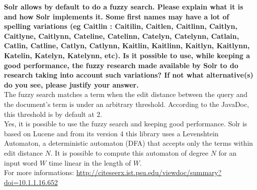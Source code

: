 \documentclass[a4paper]{article}
\begin{document}
\textbf{Solr allows by default to do a fuzzy search. Please explain what it is and how Solr implements it. Some first names may have a lot of spelling variations (eg Caitlin : Caitilin, Caitlen, Caitlinn, Caitlyn, Caitlyne, Caitlynn, Cateline, Catelinn, Catelyn, Catelynn, Catlain, Catlin, Catline, Catlyn, Catlynn, Kaitlin, Kaitlinn, Kaitlyn, Kaitlynn, Katelin, Katelyn, Katelynn, etc). Is it possible to use, while keeping a good performance, the fuzzy research made available by Solr to do research taking into account such variations? If not what alternative(s) do you see, please justify your answer.} \\

The fuzzy search matches a term when the edit distance between the query and the document's term is under an arbitrary threshold. According to the JavaDoc, this threshold is by default at $2$. \\

Yes, it is possible to use the fuzzy search and keeping good performance. Solr is based on Lucene and from its version 4 this library uses a Levenshtein Automaton, a deterministic automaton (DFA) that accepts only the terms within edit distance $N$. It is possible to compute this automaton of degree $N$ for an input word $W$ time linear in the length of $W$. \\

For more informations: \url{http://citeseerx.ist.psu.edu/viewdoc/summary?doi=10.1.1.16.652}
\end{document}
